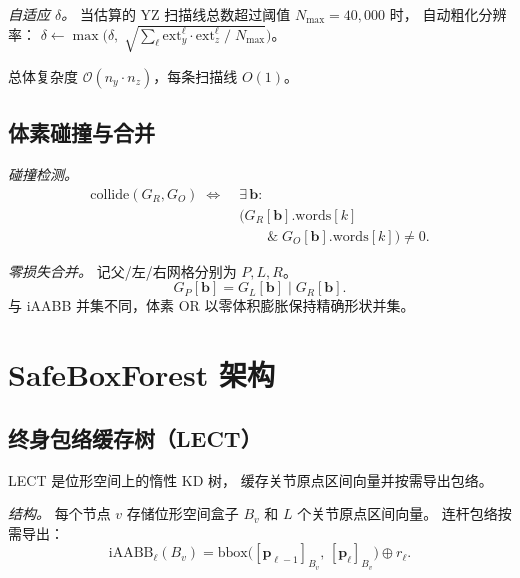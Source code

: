 \documentclass[journal]{IEEEtran}
\newcommand{\iAABB}{\text{iAABB}}
\newcommand{\calO}{\mathcal{O}}
\begin{document}
\emph{自适应 $\delta$。}
当估算的 YZ 扫描线总数超过阈值 $N_{\max}{=}40{,}000$ 时，
自动粗化分辨率：
$\delta \leftarrow \max\!\bigl(\delta,\;
\sqrt{\textstyle\sum_\ell \mathrm{ext}_y^\ell \cdot
\mathrm{ext}_z^\ell \;/\; N_{\max}}\bigr)$。

总体复杂度 $\calO(n_y \cdot n_z)$，每条扫描线 $O(1)$。

\subsection{体素碰撞与合并}\label{sec:voxel_ops}

\emph{碰撞检测。}
\begin{equation}
  \begin{aligned}
    \text{collide}(G_R, G_O) \;\Leftrightarrow\;&\exists\, \bm{b}: \\
    &\bigl(G_R[\bm{b}].\mathrm{words}[k]\\
    &\qquad\mathbin{\&}\; G_O[\bm{b}].\mathrm{words}[k]\bigr) \ne 0.
  \end{aligned}
\end{equation}

\emph{零损失合并。}
记父/左/右网格分别为 $P,L,R$。
\begin{equation}
  G_P[\bm{b}] = G_L[\bm{b}] \mathbin{|} G_R[\bm{b}].
\end{equation}
与 iAABB 并集不同，体素 OR 以零体积膨胀保持精确形状并集。

\section{SafeBoxForest 架构}\label{sec:sbf}


\subsection{终身包络缓存树（LECT）}\label{sec:lect}

LECT 是位形空间上的惰性 KD 树，
缓存关节原点区间向量并按需导出包络。

\emph{结构。}
每个节点 $v$ 存储位形空间盒子 $B_v$
和 $L$ 个关节原点区间向量。
连杆包络按需导出：
\begin{equation}\label{eq:lect_iaabb}
  \iAABB_\ell(B_v)=\mathrm{bbox}\!\bigl([\bm{p}_{\ell-1}]_{B_v},\,[\bm{p}_\ell]_{B_v}\bigr)\oplus r_\ell.
\end{equation}
\end{document}
